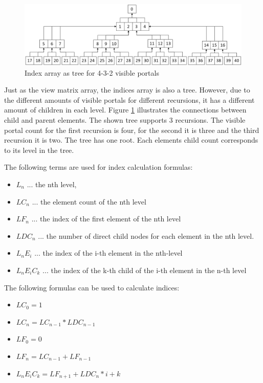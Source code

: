 \begin{figure}[h]
	\includegraphics[width=\linewidth]{images/indexarray.png}
	\caption{Index array as tree for 4-3-2 visible portals}
	\label{fig:indexarray}
\end{figure}

Just as the view matrix array, the indices array is also a tree. However, due to the different amounts of visible portals for different recursions, it has a different amount of children in each level. Figure \ref{fig:indexarray} illustrates the connections between child and parent elements. The shown tree supports 3 recursions. The visible portal count for the first recursion is four, for the second it is three and the third recursion it is two. The tree has one root. Each elements child count corresponds to its level in the tree.

The following terms are used for index calculation formulas:
\begin{itemize}
	\item $L_n$ ... the nth level,
	\item $LC_n$ ... the element count of the nth level
	\item $LF_n$ ... the index of the first element of the nth level
	\item $LDC_n$ ... the number of direct child nodes for each element in the nth level. 
	\item $L_nE_i$ ... the index of the i-th element in the nth-level
	\item $L_nE_iC_k$ ... the index of the k-th child of the i-th element in the n-th level 
\end{itemize}

The following formulas can be used to calculate indices:

\begin{itemize}
	\item $LC_0 = 1$
	\item $LC_n = LC_{n-1} * LDC_{n-1}$
	\item $LF_0 = 0$
	\item $LF_n = LC_{n-1} + LF_{n-1}$
	\item $L_nE_iC_k = LF_{n+1} + LDC_{n} * i + k$
\end{itemize}

